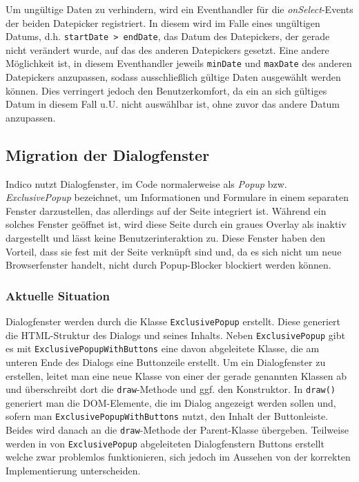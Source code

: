 
Um ungültige Daten zu verhindern, wird ein Eventhandler für die \emph{onSelect}-Events der beiden
Datepicker registriert. In diesem wird im Falle eines ungültigen Datums, d.h.
\lstinline{startDate > endDate}, das Datum des Datepickers, der gerade nicht verändert wurde, auf
das des anderen Datepickers gesetzt. Eine andere Möglichkeit ist, in diesem Eventhandler jeweils
\lstinline{minDate} und \lstinline{maxDate} des anderen Datepickers anzupassen, sodass
ausschließlich gültige Daten ausgewählt werden können. Dies verringert jedoch den Benutzerkomfort,
da ein an sich gültiges Datum in diesem Fall u.U. nicht auswählbar ist, ohne zuvor das andere Datum
anzupassen.



\subsection{Migration der Dialogfenster}

Indico nutzt Dialogfenster, im Code normalerweise als \emph{Popup} bzw. \emph{ExclusivePopup}
bezeichnet, um Informationen und Formulare in einem separaten Fenster darzustellen, das allerdings
auf der Seite integriert ist. Während ein solches Fenster geöffnet ist, wird diese Seite durch ein
graues Overlay als inaktiv dargestellt und lässt keine Benutzerinteraktion zu. Diese Fenster haben
den Vorteil, dass sie fest mit der Seite verknüpft sind und, da es sich nicht um neue
Browserfenster handelt, nicht durch Popup-Blocker blockiert werden können.

\subsubsection{Aktuelle Situation}

Dialogfenster werden durch die Klasse \lstinline{ExclusivePopup} erstellt. Diese generiert die
HTML-Struktur des Dialogs und seines Inhalts. Neben \lstinline{ExclusivePopup} gibt es mit
\lstinline{ExclusivePopupWithButtons} eine davon abgeleitete Klasse, die am unteren Ende des
Dialogs eine Buttonzeile erstellt. Um ein Dialogfenster zu erstellen, leitet man eine neue Klasse
von einer der gerade genannten Klassen ab und überschreibt dort die \lstinline{draw}-Methode und
ggf. den Konstruktor. In \lstinline{draw()} generiert man die DOM-Elemente, die im Dialog
angezeigt werden sollen und, sofern man \lstinline{ExclusivePopupWithButtons} nutzt, den Inhalt der
Buttonleiste. Beides wird danach an die \lstinline{draw}-Methode der Parent-Klasse übergeben.
Teilweise werden in von \lstinline{ExclusivePopup} abgeleiteten Dialogfenstern Buttons erstellt welche
zwar problemlos funktionieren, sich jedoch im Aussehen von der korrekten Implementierung
unterscheiden.

